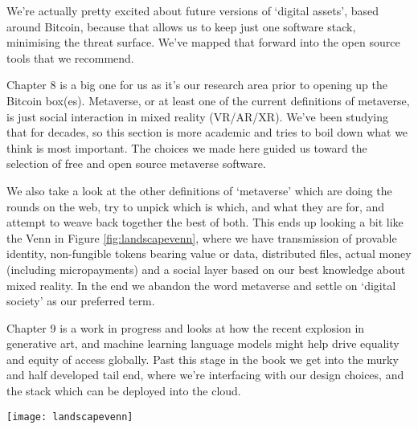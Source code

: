 We’re actually pretty excited about future versions of `digital assets', based around Bitcoin, because that allows us to keep just one software stack, minimising the threat surface. We’ve mapped that forward into the open source tools that we recommend.\par
Chapter 8 is a big one for us as it’s our research area prior to opening up the Bitcoin box(es). Metaverse, or at least one of the current definitions of metaverse, is just social interaction in mixed reality (VR/AR/XR). We’ve been studying that for decades, so this section is more academic and tries to boil down what we think is most important. The choices we made here guided us toward the selection of free and open source metaverse software.\par
We also take a look at the other definitions of `metaverse' which are doing the rounds on the web, try to unpick which is which, and what they are for, and attempt to weave back together the best of both. This ends up looking a bit like the Venn in Figure \ref{fig:landscapevenn}, where we have transmission of provable identity, non-fungible tokens bearing value or data, distributed files, actual money (including micropayments) and a social layer based on our best knowledge about mixed reality. In the end we abandon the word metaverse and settle on `digital society' as our preferred term.\par
Chapter 9 is a work in progress and looks at how the recent explosion in generative art, and machine learning language models might help drive equality and equity of access globally. Past this stage in the book we get into the murky and half developed tail end, where we’re interfacing with our design choices, and the stack which can be deployed into the cloud.\par

\begin{figure*}[ht]\centering %
	\texttt{[image: landscapevenn]}
	\caption{Distributed web, metaverse, and Bitcoin are intersectional technologies.}
	\label{fig:landscapevenn}
\end{figure*}

